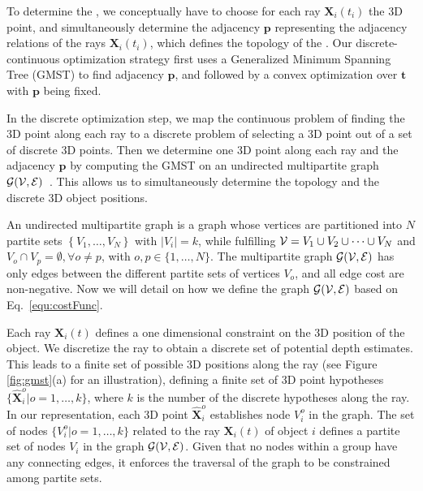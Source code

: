 \label{sec:gmst}
To determine the \oct, we conceptually have to choose for each ray $\mathbf{X}_i(t_i) $ the 3D point, and simultaneously determine the adjacency $\mathbf{p}$ representing the adjacency relations of the rays $\mathbf{X}_i(t_i) $, which defines the topology of the \oct.
Our discrete-continuous optimization strategy first uses a Generalized Minimum Spanning Tree (GMST) to find adjacency $\mathbf{p}$, and followed by a convex optimization over $\mathbf{t}$ with $\mathbf{p}$ being fixed.

In the discrete optimization step, we map the continuous problem of finding the 3D point along each ray to a discrete problem of selecting a 3D point out of a set of discrete 3D points. Then we determine one 3D point along each ray and the adjacency $\mathbf{p}$ by computing the GMST on an undirected multipartite graph $\cal{G}(V,E)$~\cite{MyungLT_95}. This allows us to simultaneously  determine the topology and the discrete 3D object positions.

An undirected multipartite graph is a graph whose vertices are partitioned into $N$ partite sets $\left\{V_1, \dots, V_N\right\}$ with $\vert V_i \vert = k$, while fulfilling ${\cal V}=V_1 \cup V_2 \cup \dots \cup V_N$ and $V_o \cap V_p = \emptyset, \forall o\neq p$, with $o,p \in \{1, \dots, N \}$. The multipartite graph $\cal{G}(V,E)$ has only edges between the different partite sets  of vertices $V_o$, and all edge cost are non-negative. Now we will detail on how we define the graph $\cal{G}(V,E)$ based on Eq.~\ref{equ:costFunc}.

Each ray $\mathbf{X}_i(t)$ defines a one dimensional constraint on the 3D position of the object. We discretize the ray to obtain a discrete set of potential depth estimates. This leads to a finite set of possible 3D positions along the ray (see Figure \ref{fig:gmst}(a) for an illustration), defining a finite set of 3D point hypotheses %
$\{\mathbf{\hat{X}}_i^o|o=1,\dots,k \}$,
where $k$ is the number of the discrete hypotheses along the ray.
In our representation, each 3D point $\mathbf{\hat{X}}_i^o$ establishes node $V_i^o$ in the graph. The set of nodes $\{V_i^o|o=1, \dots, k\}$ related to the ray $\mathbf{X}_i(t)$ of object $i$ defines a partite set of nodes $V_i$ in the graph $\cal{G}(V,E)$. 
Given that no nodes within a group have any connecting edges, it enforces the traversal of the graph to be constrained among partite sets. 

